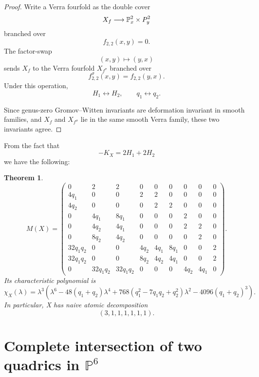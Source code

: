 \documentclass[11pt]{amsart}
\theoremstyle{plain}
\newtheorem{theorem}{Theorem}[section]
\numberwithin{equation}{section}
\theoremstyle{definition}
\theoremstyle{remark}
\renewcommand{\P}{\mathbb P}
\begin{document}
\begin{proof}
Write a Verra fourfold as the double cover
\[
X_f \longrightarrow \P^2_x\times \mathbb \P^2_y
\]
branched over
\[
f_{2,2}(x,y)=0.
\]
The factor-swap
\[
(x,y)\longmapsto (y,x)
\]
sends \(X_f\) to the Verra fourfold \(X_{f^\sigma}\) branched over
\[
f^\sigma_{2,2}(x,y)=f_{2,2}(y,x).
\]
Under this operation,
\[
H_1\leftrightarrow H_2,
\qquad
q_1\leftrightarrow q_2.
\]

Since genus-zero Gromov--Witten invariants are deformation invariant in smooth families, and \(X_f\) and \(X_{f^\sigma}\) lie in the same smooth Verra family, these two invariants agree. 
\end{proof}
 
From the fact that
\[
-K_X = 2H_1 + 2H_2
\]
we have the following:
\begin{theorem}
\[
M(X)
=
\begin{pmatrix}
0&2&2&0&0&0&0&0&0\\
4q_1&0&0&2&2&0&0&0&0\\
4q_2&0&0&0&2&2&0&0&0\\
0&4q_1&8q_1&0&0&0&2&0&0\\
0&4q_2&4q_1&0&0&0&2&2&0\\
0&8q_2&4q_2&0&0&0&0&2&0\\
32q_1q_2&0&0&4q_2&4q_1&8q_1&0&0&2\\
32q_1q_2&0&0&8q_2&4q_2&4q_1&0&0&2\\
0&32q_1q_2&32q_1q_2&0&0&0&4q_2&4q_1&0
\end{pmatrix}.
\]
Its characteristic polynomial is
\[
\chi_X(\lambda)
=
\lambda^3
\left(
\lambda^6
-48(q_1+q_2)\lambda^4
+768(q_1^2-7q_1q_2+q_2^2)\lambda^2
-4096(q_1+q_2)^3
\right).
\]
In particular, X has naive atomic decomposition
\[
(3,1,1,1,1,1,1).
\]
\end{theorem}


\section{Complete intersection of two quadrics in $\P^6$}\label{sCIQuadrics}
\end{document}
